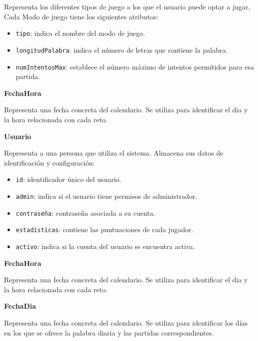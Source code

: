 \documentclass[a4paper,11pt]{article}
\begin{document}
Representa los diferentes tipos de juego a los que el usuario puede optar a jugar, Cada Modo de juego tiene los siguientes atributos:

\begin{itemize}
    \item \texttt{tipo}: indica el nombre del modo de juego.
    \item \texttt{longitudPalabra}: indica el número de letras que contiene la palabra.
    \item \texttt{numIntentosMax}: establece el número máximo de intentos permitidos para esa partida.
\end{itemize}

\par\vspace{0.5cm}
\noindent\textbf{FechaHora}

Representa una fecha concreta del calendario. Se utiliza para identificar el dia y la hora relacionada con cada reto.

\par\vspace{0.5cm}
\noindent\textbf{Usuario}

Representa a una persona que utiliza el sistema. Almacena sus datos de identificación y configuración:

\begin{itemize}
    \item \texttt{id}: identificador único del usuario.
    \item \texttt{admin}: indica si el usuario tiene permisos de administrador.
    \item \texttt{contraseña}: contraseña asociada a su cuenta.
    \item \texttt{estadísticas}: contiene las puntuaciones de cada jugador.
    \item \texttt{activo}: indica si la cuenta del usuario se encuentra activa.
\end{itemize}

\par\vspace{0.5cm}
\noindent\textbf{FechaHora}

Representa una fecha concreta del calendario. Se utiliza para identificar el dia y la hora relacionada con cada reto.

\par\vspace{0.5cm}
\noindent\textbf{FechaDia}

Representa una fecha concreta del calendario. Se utiliza para identificar los días en los que se ofrece la palabra diaria y las partidas correspondientes.
\end{document}
